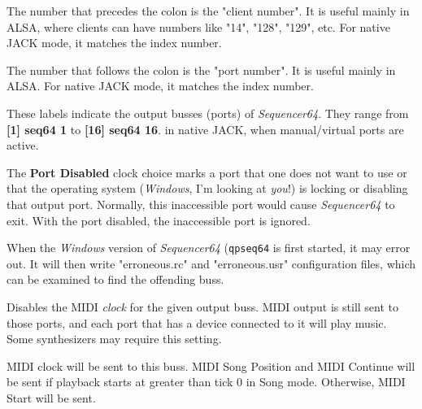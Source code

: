    The number that precedes the colon is the "client number".
   It is useful mainly in ALSA, where clients can have numbers like "14",
   "128", "129", etc.  For native JACK mode, it matches the index number.

   The number that follows the colon is the "port number".
   It is useful mainly in ALSA.
   For native JACK mode, it matches the index number.

   These labels indicate the output busses (ports) of \textsl{Sequencer64}.
   They range from \textbf{[1] seq64 1} to \textbf{[16] seq64 16}.
   in native JACK, when manual/virtual ports are active.

   The \textbf{Port Disabled} clock choice marks a port
   that one does not want to use or that the operating system
   (\textsl{Windows}, I'm looking at \textsl{you}!)
   is locking or disabling that output port.
   Normally, this inaccessible port would cause \textsl{Sequencer64} to exit.
   With the port disabled, the inaccessible port is ignored.

   When the \textsl{Windows} version of \textsl{Sequencer64}
   (\texttt{qpseq64} is first started, it may error out.
   It will then write "erroneous.rc" and "erroneous.usr" configuration
   files, which can be examined to find the offending buss.

   Disables the MIDI \textsl{clock} for the given output buss.
   MIDI output is still sent to those ports, and
   each port that has a device connected to it will play music.
   Some synthesizers may require this setting.

   MIDI clock will be sent to this buss.
   MIDI Song Position and MIDI Continue will be sent if playback starts
   at greater than tick 0 in Song mode.  Otherwise, MIDI Start will be sent.

